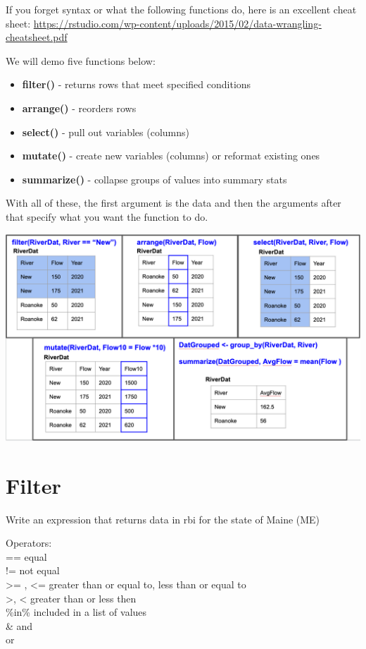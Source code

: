 \documentclass[
]{book}
\providecommand{\tightlist}{%
  \setlength{\itemsep}{0pt}\setlength{\parskip}{0pt}}
\begin{document}
If you forget syntax or what the following functions do, here is an excellent cheat sheet: \url{https://rstudio.com/wp-content/uploads/2015/02/data-wrangling-cheatsheet.pdf}

We will demo five functions below:

\begin{itemize}
\tightlist
\item
  \textbf{filter()} - returns rows that meet specified conditions
\item
  \textbf{arrange()} - reorders rows
\item
  \textbf{select()} - pull out variables (columns)
\item
  \textbf{mutate()} - create new variables (columns) or reformat existing ones
\item
  \textbf{summarize()} - collapse groups of values into summary stats
\end{itemize}

With all of these, the first argument is the data and then the arguments after that specify what you want the function to do.

\includegraphics{images/dplyr functions.png}

\hypertarget{filter}{%
\section{Filter}\label{filter}}

Write an expression that returns data in rbi for the state of Maine (ME)

Operators:\\
== equal\\
!= not equal\\
\textgreater= , \textless= greater than or equal to, less than or equal to\\
\textgreater, \textless{} greater than or less then\\
\%in\% included in a list of values\\
\& and\\
\textbar{} or
\end{document}
